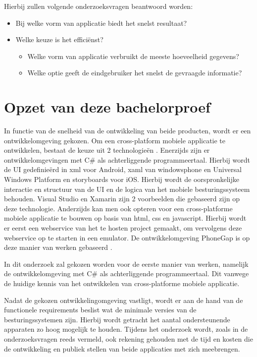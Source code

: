 Hierbij zullen volgende onderzoeksvragen beantwoord worden:
\begin{itemize}
  \item{Bij welke vorm van applicatie biedt het snelst resultaat?}
  \item{Welke keuze is het efficiënst?}
  \begin{itemize}
    \item{Welke vorm van applicatie verbruikt de meeste hoeveelheid gegevens?}
    \item{Welke optie geeft de eindgebruiker het snelst de gevraagde informatie?}
  \end{itemize}
\end{itemize}
\newpage
\section{Opzet van deze bachelorproef}
\label{sec:opzet-bachelorproef}
In functie van de snelheid van de ontwikkeling van beide producten, wordt er een ontwikkelomgeving gekozen.
Om een cross-platform mobiele applicatie te ontwikkelen, bestaat de keuze uit 2 technologieën . Enerzijds zijn er
ontwikkelomgevingen met C\# als achterliggende programmeertaal. Hierbij wordt de UI gedefinieërd in xml voor Android,
xaml van windowsphone en Universal Windows Platform en storyboards voor iOS. Hierbij wordt de oorspronkelijke interactie
en structuur van de UI en de logica van het mobiele besturingssysteem behouden. Visual Studio en Xamarin zijn 2 voorbeelden
die gebaseerd zijn op deze technologie. Anderzijds kan men ook opteren voor een cross-platforme mobiele applicatie te bouwen op basis van html, css en javascript.
Hierbij wordt er eerst een webservice van het te hosten project gemaakt, om vervolgens deze webservice op te starten in een emulator.
De ontwikkelomgeving PhoneGap is op deze manier van werken gebaseerd \citep{adobesystemsinc2017}.

In dit onderzoek zal gekozen worden voor de eerste manier van werken, namelijk de ontwikkelomgeving met C\# als achterliggende
programmeertaal. Dit vanwege de huidige kennis van het ontwikkelen van cross-platforme mobiele applicatie.

Nadat de gekozen ontwikkelingomgeving vastligt, wordt er aan de hand van de functionele requirements beslist wat de
minimale versies van de besturingssystemen zijn. Hierbij wordt getracht het aantal ondersteunende apparaten zo hoog mogelijk te houden.
Tijdens het onderzoek wordt, zoals in de onderzoeksvragen reeds vermeld, ook rekening gehouden met de tijd en kosten die de ontwikkeling
en publiek stellen van beide applicaties met zich meebrengen.

